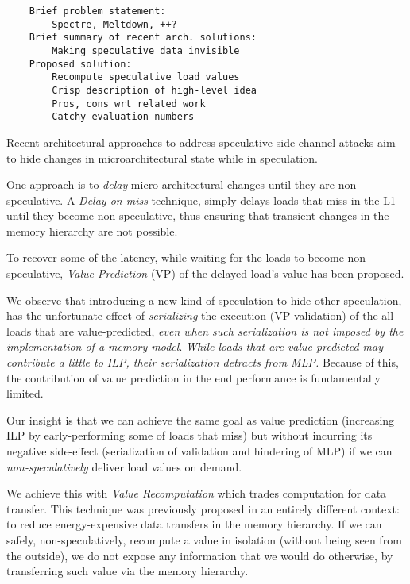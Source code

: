 \begin{verbatim}
    Brief problem statement: 
        Spectre, Meltdown, ++?
    Brief summary of recent arch. solutions: 
        Making speculative data invisible
    Proposed solution: 
        Recompute speculative load values
        Crisp description of high-level idea
        Pros, cons wrt related work
        Catchy evaluation numbers
\end{verbatim}

Recent architectural approaches to address speculative side-channel attacks aim to hide changes in microarchitectural state while in speculation. 

One approach is to \emph{delay} micro-architectural changes until they are non-speculative. A \emph{Delay-on-miss} technique, simply delays loads that miss in the L1 until they become non-speculative, thus ensuring that transient changes in the memory hierarchy are not possible.

To recover some of the latency, while waiting for the loads to become non-speculative, \emph{Value Prediction} (VP) of the delayed-load's value has been proposed.

We observe that introducing a new kind of speculation to hide other speculation, has the unfortunate effect of \emph{serializing} the execution (VP-validation) of the all loads that are value-predicted, \emph{even when such serialization is not imposed by the implementation of a memory model}. \emph{While loads that are value-predicted may contribute a little to ILP, their serialization detracts from MLP.} Because of this, the contribution of value prediction in the end performance is fundamentally limited.

Our insight is that we can achieve the same goal as value prediction (increasing ILP by early-performing some of loads that miss) but without incurring its negative side-effect (serialization of validation and hindering of MLP) if we can \emph{non-speculatively} deliver load values on demand. 

We achieve this with \emph{Value Recomputation} which trades computation for data transfer. This technique was previously proposed in an entirely different context: to reduce energy-expensive data transfers in the memory hierarchy. If we can safely, non-speculatively, recompute a value in isolation (without being seen from the outside), we do not expose any information that we would do otherwise, by transferring such value via the memory hierarchy.

